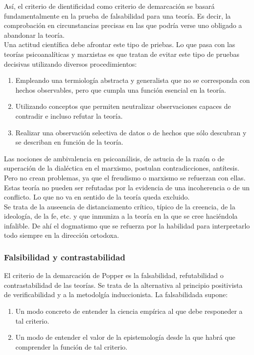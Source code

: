 \documentclass[a4paper, 11pt, twocolumn, spanish]{article}
\begin{document}
Así, el criterio de dientificidad como criterio de demarcación se
basará fundamentalmente en la prueba de falsabilidad para una
teoría. Es decir, la comprobación en circunstancias precisas en las
que podría verse uno obligado a abandonar la teoría.\\
Una actitud científica debe afrontar este tipo de priebas. Lo que pasa
con las teorías psicoanalíticas y marxistas es que tratan de evitar
este tipo de pruebas decisivas utilizando diversos procedimientos:
\begin{enumerate}
\item Empleando una termiología abstracta y generalista que no se
corresponda con hechos observables, pero que cumpla una función
esencial en la teoría.
\item Utilizando conceptos que permiten neutralizar observaciones
capaces de contradir e incluso refutar la teoría.
\item Realizar una observación selectiva de datos o de hechos que sólo
descubran y se describan en función de la teoría.
\end{enumerate}

Las nociones de ambivalencia en psicoanálisis, de astucia de la razón
o de superación de la dialéctica en el marxismo, postulan
contradicciones, antítesis. Pero no crean problemas, ya que el
freudismo o marxismo se refuerzan con ellas. Estas teoría no pueden
ser refutadas por la evidencia de una incoherencia o de un
conflicto. Lo que no va en sentido de la teoría queda excluido.\\
Se trata de la auseencia de distanciamento crítico, típico de la
creencia, de la ideología, de la fe, etc. y que inmuniza a la teoría
en la que se cree haciéndola infalible. De ahí el dogmatismo que se
refuerza por la habilidad para interpretarlo todo siempre en la
dirección ortodoxa.

\subsubsection{Falsibilidad y contrastabilidad}
\label{sec:orgb2be11b}
El criterio de la demarcación de Popper es la falsabilidad,
refutabilidad o contrastabilidad de las teorías. Se trata de la
alternativa al principio positivista de verificabilidad y a la
metodolgía induccionista. La falsabilidada supone:
\begin{enumerate}
\item Un modo concreto de entender la ciencia empírica al que debe
responeder a tal criterio.
\item Un modo de entender el valor de la epistemología desde la que
habrá que comprender la función de tal criterio.
\end{enumerate}
\end{document}
